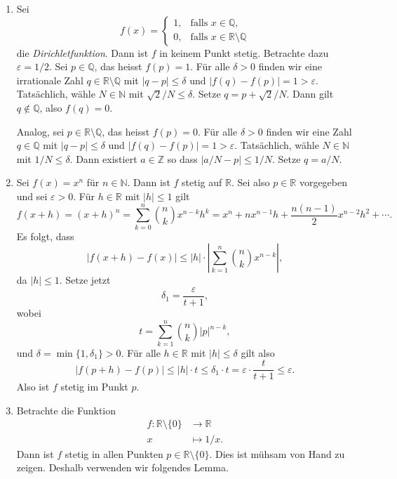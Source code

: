 \documentclass[../main.tex]{subfiles}
\begin{document}
\begin{examples}
\begin{enumerate}[(1)]
    \item Sei
      \[
        f(x) = 
        \begin{cases}
          1, & \text{falls } x \in \mathbb{Q}, \\
        0,& \text{falls } x \in \mathbb{R} \setminus \mathbb{Q}
        \end{cases}
      \]
      die \emph{Dirichletfunktion}.
      Dann ist $f$ in keinem Punkt stetig.
      Betrachte dazu $\varepsilon = 1/2$.
      Sei $p \in \mathbb{Q}$, das heisst $f(p) = 1$.
      Für alle $\delta > 0$ finden wir eine
      irrationale Zahl
      $q \in \mathbb{R} \setminus \mathbb{Q}$ mit
      $|q - p| \leq \delta$ 
      und
      $|f(q) - f(p)| = 1 > \varepsilon$.
      Tatsächlich, wähle $N \in \mathbb{N}$ 
      mit $\sqrt 2 / N \leq \delta$.
      Setze
      $q = p +\sqrt 2/N$. Dann gilt  $q \notin \mathbb{Q}$,
      also $f(q) = 0$.

      Analog, sei $p \in \mathbb{R} \setminus \mathbb{Q}$,
      das heisst $f(p) = 0$.
      Für alle $\delta > 0$ finden wir
      eine Zahl $q \in \mathbb{Q}$ mit $|q - p| \leq \delta$ 
      und
      $|f(q) - f(p)| = 1 > \varepsilon$.
      Tatsächlich,
      wähle $N \in \mathbb{N}$ mit $1/N \leq \delta$.
      Dann existiert $a \in \mathbb{Z}$
      so dass
      $|a/N - p| \leq 1/N$.
      Setze $q = a/N$.
    \item Sei $f(x) = x^n$ für $n \in \mathbb{N}$.
      Dann ist $f$ stetig auf $\mathbb{R}$.
      Sei also $p \in \mathbb{R}$ vorgegeben und
      sei $\varepsilon > 0$.
      Für
      $h \in \mathbb{R}$ mit $|h| \leq 1$ gilt
      \[
        f(x + h) = (x + h)^n = \sum_{k=0}^{n} \binom{n}{k}
        x^{n-k}h^k
        = x^n + nx^{n-1}h + \frac{n(n-1)}{2}x^{n-2}h^2 + \cdots.
      \]
      Es folgt, dass
      \[
        |f(x + h) - f(x)| \leq |h| \cdot
        \left| \sum_{k=1}^{n} \binom{n}{k} x^{n-k} \right|,
      \]
      da $|h| \leq 1$.
      Setze jetzt
      \[
        \delta_1 = \frac{\varepsilon}{t+1},
      \]
      wobei
      \[
        t = \sum_{k=1}^{n} \binom{n}{k} |p|^{n-k},
      \]
      und $\delta = \min \{1, \delta_1\} > 0$.
      Für alle  $h \in \mathbb{R}$
      mit $|h| \leq \delta$ gilt also
      \[
        |f(p+h) - f(p)| \leq |h| \cdot t \leq
        \delta_1 \cdot t = \varepsilon \cdot \frac{t}{t+1}
        \leq \varepsilon.
      \]
      Also ist $f$ stetig im Punkt $p$.
    \item Betrachte die Funktion
      \begin{align*}
        f \colon \mathbb{R} \setminus \{0\} & \to \mathbb{R} \\
        x & \mapsto 1/x.
      \end{align*}
      Dann ist $f$ stetig in allen Punkten
      $p \in \mathbb{R} \setminus \{0\}$. Dies ist
      mühsam von Hand zu zeigen. Deshalb
      verwenden wir folgendes Lemma.
  \end{enumerate}
\end{examples}
\end{document}

